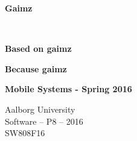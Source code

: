 
\begin{center}
	
	\vspace{8cm}

	\begin{spacing}{2.1}
		\begin{Huge}
			\textbf{Gaimz}
		\end{Huge}
		\\
		\begin{huge}
			\textbf{Based on gaimz}
		\end{huge}
	\end{spacing}

	\vspace{0.6cm}

	\begin{Large}
		\textbf{Because gaimz}
	\end{Large}

	\vspace{1cm}

	\begin{large} 
		\textbf{Mobile Systems - Spring 2016}
	\end{large}

	\vspace*{\fill}


	\vspace*{\fill}

	Aalborg University		\\
	Software -- P8 -- 2016	\\
	SW808F16				\\

\end{center}



\thispagestyle{empty}